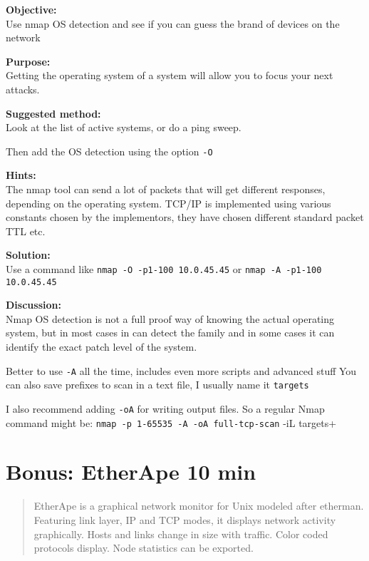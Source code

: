 \documentclass[a4paper,11pt,notitlepage]{report}
\begin{document}
{\bf Objective:} \\
Use nmap OS detection and see if you can guess the brand of devices on the network

{\bf Purpose:}\\
Getting the operating system of a system will allow you to focus your next attacks.

{\bf Suggested method:}\\
Look at the list of active systems, or do a ping sweep.

Then add the OS detection using the option \verb+-O+



{\bf Hints:} \\
The nmap tool can send a lot of packets that will get different responses, depending on the operating system. TCP/IP is implemented using various constants chosen by the implementors, they have chosen different standard packet TTL etc.

{\bf Solution:}\\
Use a command like \verb+nmap -O -p1-100 10.0.45.45+ or  \verb+nmap -A -p1-100 10.0.45.45+


{\bf Discussion:}\\
Nmap OS detection is not a full proof way of knowing the actual operating system, but in most cases in can detect the family and in some cases it can identify the exact patch level of the system.

Better to use \verb+-A+ all the time, includes even more scripts and advanced stuff
You can also save prefixes to scan in a text file, I usually name it \verb+targets+

I also recommend adding \verb+-oA+ for writing output files. So a regular Nmap command might be:
\verb+nmap -p 1-65535 -A -oA full-tcp-scan+ -iL targets+


\chapter{Bonus: EtherApe 10 min}
\label{ex:etherape}


\begin{quote}
EtherApe is a graphical network monitor for Unix modeled after etherman. Featuring link layer, IP and TCP modes, it displays network activity graphically. Hosts and links change in size with traffic. Color coded protocols display.
Node statistics can be exported.
\end{quote}
\end{document}
